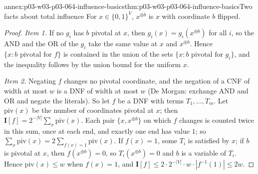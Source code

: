 \begin{annexitem}{annex:p03-w03-p03-064-influence-basics}{thm:p03-w03-p03-064-influence-basics}{Two facts about total influence}
For \(x\in\{0,1\}^V\), \(x^{\oplus b}\) is \(x\) with coordinate \(b\)
flipped.
\begin{proof}
\emph{Item 1.}  If no \(g_i\) has \(b\) pivotal at \(x\), then
\(g_i(x)=g_i(x^{\oplus b})\) for all \(i\), so the AND and the OR of the
\(g_i\) take the same value at \(x\) and \(x^{\oplus b}\).  Hence
\(\{x:b\text{ pivotal for }f\}\) is contained in the union of the sets
\(\{x:b\text{ pivotal for }g_i\}\), and the inequality follows by the union
bound for the uniform \(x\).

\emph{Item 2.}  Negating \(f\) changes no pivotal coordinate, and the
negation of a CNF of width at most \(w\) is a DNF of width at most \(w\)
(De Morgan: exchange AND and OR and negate the literals).  So let \(f\) be a
DNF with terms \(T_1,\ldots,T_m\).  Let \(\mathrm{piv}(x)\) be the number of
coordinates pivotal at \(x\); then
\(\mathbf I[f]=2^{-|V|}\sum_x\mathrm{piv}(x)\).  Each pair
\(\{x,x^{\oplus b}\}\) on which \(f\) changes is counted twice in this sum,
once at each end, and exactly one end has value \(1\); so
\(\sum_x\mathrm{piv}(x)=2\sum_{f(x)=1}\mathrm{piv}(x)\).  If \(f(x)=1\), some
\(T_i\) is satisfied by \(x\); if \(b\) is pivotal at \(x\), then
\(f(x^{\oplus b})=0\), so \(T_i(x^{\oplus b})=0\) and \(b\) is a variable of
\(T_i\).  Hence \(\mathrm{piv}(x)\leq w\) when \(f(x)=1\), and
\(\mathbf I[f]\leq2\cdot2^{-|V|}\cdot w\cdot|f^{-1}(1)|\leq2w\).
\end{proof}
\end{annexitem}


